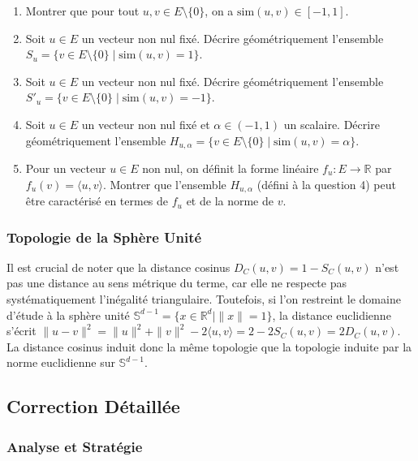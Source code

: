 \documentclass[11pt,a4paper]{report}
\begin{document}
\begin{enumerate}
\def\labelenumi{\arabic{enumi}.}

\item
  Montrer que pour tout \(u, v \in E \setminus \{0\}\), on a
  \(\text{sim}(u, v) \in [-1, 1]\).
\item
  Soit \(u \in E\) un vecteur non nul fixé. Décrire géométriquement
  l'ensemble
  \(S_u = \{v \in E \setminus \{0\} \mid \text{sim}(u, v) = 1\}\).
\item
  Soit \(u \in E\) un vecteur non nul fixé. Décrire géométriquement
  l'ensemble
  \(S'_u = \{v \in E \setminus \{0\} \mid \text{sim}(u, v) = -1\}\).
\item
  Soit \(u \in E\) un vecteur non nul fixé et \(\alpha \in (-1, 1)\) un
  scalaire. Décrire géométriquement l'ensemble
  \(H_{u, \alpha} = \{v \in E \setminus \{0\} \mid \text{sim}(u, v) = \alpha\}\).
\item
  Pour un vecteur \(u \in E\) non nul, on définit la forme linéaire
  \(f_u: E \to \mathbb{R}\) par \(f_u(v) = \langle u, v \rangle\).
  Montrer que l'ensemble \(H_{u, \alpha}\) (défini à la question 4) peut
  être caractérisé en termes de \(f_u\) et de la norme de \(v\).
\end{enumerate}

\hypertarget{topologie-de-la-sphuxe8re-unituxe9}{%
\subsubsection{Topologie de la Sphère
Unité}\label{topologie-de-la-sphuxe8re-unituxe9}}

Il est crucial de noter que la distance cosinus
\(D_C(u,v) = 1 - S_C(u,v)\) n'est pas une distance au sens métrique du
terme, car elle ne respecte pas systématiquement l'inégalité
triangulaire. Toutefois, si l'on restreint le domaine d'étude à la
sphère unité
\(\mathbb{S}^{d-1} = \{ x \in \mathbb{R}^d \mid \|x\| = 1 \}\), la
distance euclidienne s'écrit
\(\|u - v\|^2 = \|u\|^2 + \|v\|^2 - 2\langle u, v \rangle = 2 - 2S_C(u,v) = 2 D_C(u,v)\).
La distance cosinus induit donc la même topologie que la topologie
induite par la norme euclidienne sur \(\mathbb{S}^{d-1}\).

\hypertarget{correction-duxe9tailluxe9e}{%
\subsection{Correction Détaillée}\label{correction-duxe9tailluxe9e}}

\hypertarget{analyse-et-stratuxe9gie}{%
\subsubsection{Analyse et Stratégie}\label{analyse-et-stratuxe9gie}}
\end{document}
